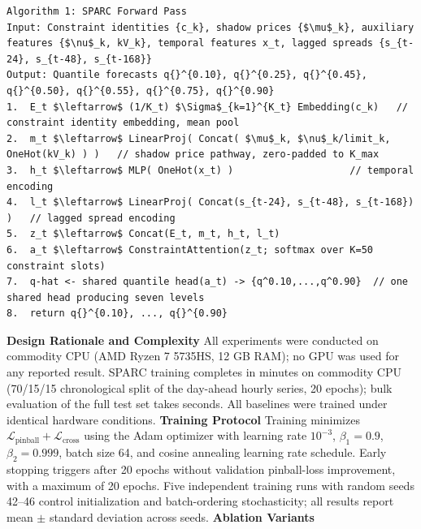 \begin{verbatim}
Algorithm 1: SPARC Forward Pass
Input: Constraint identities {c_k}, shadow prices {$\mu$_k}, auxiliary features {$\nu$_k, kV_k}, temporal features x_t, lagged spreads {s_{t-24}, s_{t-48}, s_{t-168}}
Output: Quantile forecasts q{}^{0.10}, q{}^{0.25}, q{}^{0.45}, q{}^{0.50}, q{}^{0.55}, q{}^{0.75}, q{}^{0.90}
1.  E_t $\leftarrow$ (1/K_t) $\Sigma$_{k=1}^{K_t} Embedding(c_k)   // constraint identity embedding, mean pool
2.  m_t $\leftarrow$ LinearProj( Concat( $\mu$_k, $\nu$_k/limit_k, OneHot(kV_k) ) )   // shadow price pathway, zero-padded to K_max
3.  h_t $\leftarrow$ MLP( OneHot(x_t) )                    // temporal encoding
4.  l_t $\leftarrow$ LinearProj( Concat(s_{t-24}, s_{t-48}, s_{t-168}) )   // lagged spread encoding
5.  z_t $\leftarrow$ Concat(E_t, m_t, h_t, l_t)
6.  a_t $\leftarrow$ ConstraintAttention(z_t; softmax over K=50 constraint slots)
7.  q-hat <- shared quantile head(a_t) -> {q^0.10,...,q^0.90}  // one shared head producing seven levels
8.  return q{}^{0.10}, ..., q{}^{0.90}
\end{verbatim}
\textbf{Design Rationale and Complexity}
All experiments were conducted on commodity CPU (AMD Ryzen 7 5735HS, 12 GB RAM); no GPU was used for any reported result. SPARC training completes in minutes on commodity CPU (70/15/15 chronological split of the day-ahead hourly series, 20 epochs); bulk evaluation of the full test set takes seconds. All baselines were trained under identical hardware conditions.
\textbf{Training Protocol}
Training minimizes $\mathcal{L}_{\text{pinball}} + \mathcal{L}_{\text{cross}}$ using the Adam optimizer with learning rate $10^{-3}$, $\beta_1 = 0.9$, $\beta_2 = 0.999$, batch size 64, and cosine annealing learning rate schedule. Early stopping triggers after 20 epochs without validation pinball-loss improvement, with a maximum of 20 epochs. Five independent training runs with random seeds 42--46 control initialization and batch-ordering stochasticity; all results report mean $\pm$ standard deviation across seeds.
\textbf{Ablation Variants}
